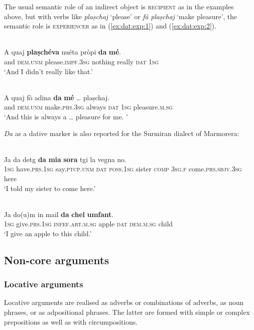The usual semantic role of an indirect object is \textsc{recipient} as in the examples above, but with verbs like \textit{plaṣchaj} `please' or \textit{fá plaṣchaj} `make pleasure', the semantic role is  \textsc{experiencer} as in (\ref{ex:dat:exp:1}) and (\ref{ex:dat:exp:2}).

\ea\label{ex:dat:exp:1}
\\
\gll A quaj \textbf{plaṣchéva} nuéta pròpi \textbf{da} \textbf{mé}. \\
and \textsc{dem.unm} please.\textsc{impf.3sg} nothing really \textsc{dat} \textsc{1sg}   \\
\glt `And I didn’t really like that.'
\z

\ea
\label{ex:dat:exp:2}
\\
\gll  A quaj fò adina \textbf{da} \textbf{mé} … plaṣchaj.  \\
and \textsc{dem.unm} make.\textsc{prs.3sg} always \textsc{dat} \textsc{1sg} {} pleasure.\textsc{m.sg} \\
\glt `And this is always a … pleasure for me. '
\z

\textit{Da} as a dative marker is also reported for the Surmiran dialect of Marmorera:

\ea\label{}
\\
\gll  Ja da detg \textbf{da} \textbf{mia} \textbf{sora} tgi la vegna no.\\
\textsc{1sg} have.\textsc{prs.1sg} say.\textsc{ptcp.unm} \textsc{dat} \textsc{poss.1sg} sister \textsc{comp} \textsc{3sg.f} come.\textsc{prs.sbjv.3sg} here\\
\glt `I told my sister to come here.'
\z

\ea\label{}
\\
\gll  Ja do(u)m in mail \textbf{da} \textbf{chel} \textbf{umfant}.\\
\textsc{1sg} give.\textsc{prs.1sg} \textsc{infef.art.m.sg} apple \textsc{dat} \textsc{dem.m.sg} child\\
\glt `I give an apple to this child.'
\z

\subsection{Non-core arguments}

\subsubsection{Locative arguments}
Locative arguments are realised as adverbs or combinations of adverbs, as noun phrases, or as adpositional phrases. The latter are formed with simple or complex prepositions as well as with circumpositions.

